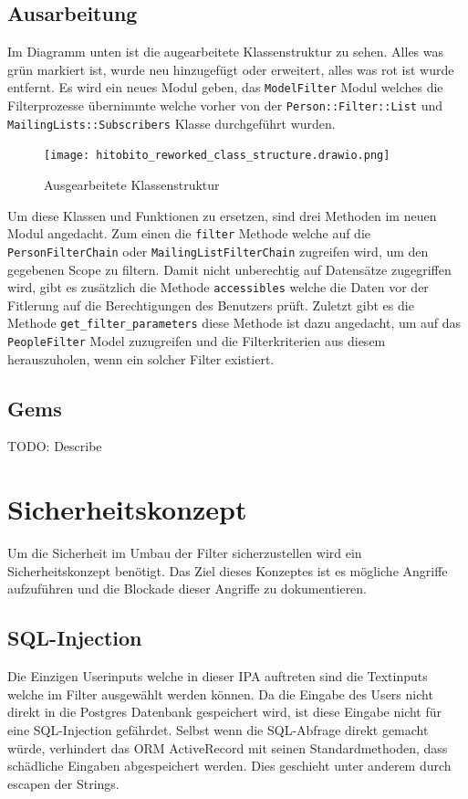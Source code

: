\newpage

\begin{landscape}
   \subsection{Ausarbeitung}
   Im Diagramm unten ist die augearbeitete Klassenstruktur zu sehen. Alles was grün markiert ist, wurde neu
   hinzugefügt oder erweitert, alles was rot ist wurde entfernt. Es wird ein neues Modul geben, das \texttt{ModelFilter} Modul
   welches die Filterprozesse übernimmte welche vorher von der \texttt{Person::Filter::List} und \texttt{MailingLists::Subscribers} Klasse
   durchgeführt wurden. 

   \begin{figure}[h]
      \centering
      \texttt{[image: hitobito\_reworked\_class\_structure.drawio.png]}
      \caption{Ausgearbeitete Klassenstruktur}
   \end{figure}

   Um diese Klassen und Funktionen zu ersetzen, sind drei Methoden im neuen Modul angedacht. Zum einen die \texttt{filter} Methode welche 
   auf die \texttt{Person\:\:Filter\:\:Chain} oder \texttt{MailingList\:\:Filter\:\:Chain} zugreifen wird, um den gegebenen Scope zu filtern.
   Damit nicht unberechtig auf Datensätze zugegriffen wird, gibt es zusätzlich die Methode \texttt{accessibles} welche die Daten vor der Fitlerung auf
   die Berechtigungen des Benutzers prüft. Zuletzt gibt es die Methode \texttt{get\_filter\_parameters} diese Methode ist dazu angedacht, um auf das \texttt{PeopleFilter}
   Model zuzugreifen und die Filterkriterien aus diesem herauszuholen, wenn ein solcher Filter existiert.


\end{landscape}

\subsection{Gems}
TODO: Describe

\section{Sicherheitskonzept}
Um die Sicherheit im Umbau der Filter sicherzustellen wird ein Sicherheitskonzept
benötigt. Das Ziel dieses Konzeptes ist es mögliche Angriffe aufzuführen
und die Blockade dieser Angriffe zu dokumentieren. 

\subsection{SQL-Injection}
Die Einzigen Userinputs welche in dieser IPA auftreten sind die Textinputs welche im Filter
ausgewählt werden können. Da die Eingabe des Users nicht direkt in die Postgres Datenbank gespeichert wird,
ist diese Eingabe nicht für eine SQL-Injection gefährdet. Selbst wenn die SQL-Abfrage direkt gemacht würde,
verhindert das ORM ActiveRecord mit seinen Standardmethoden, dass schädliche Eingaben abgespeichert werden.
Dies geschieht unter anderem durch escapen der Strings.

